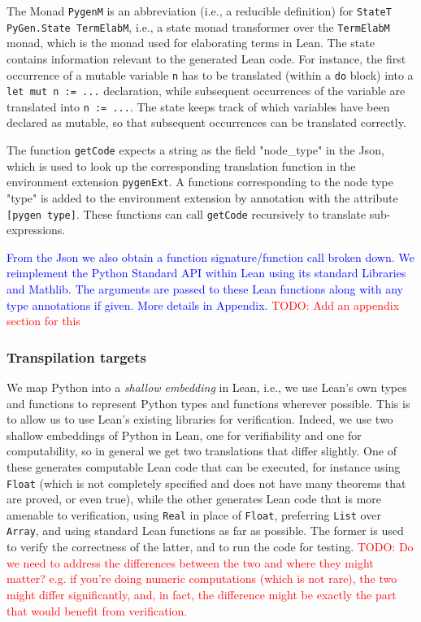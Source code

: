 \documentclass{article}
\newcommand{\code}{\lstinline}
\newcommand{\todo}[1]{\textcolor{red}{TODO: #1}}
\newcommand{\suggest}[1]{\textcolor{blue}{#1}}
\begin{document}
The Monad \code{PygenM} is an abbreviation (i.e., a reducible definition) for \code{StateT PyGen.State TermElabM}, i.e., a state monad transformer over the \code{TermElabM} monad, which is the monad used for elaborating terms in Lean. The state contains information relevant to the generated Lean code. For instance, the first occurrence of a mutable variable \code{n} has to be translated (within a \code{do} block) into a \code{let mut n := ...} declaration, while subsequent occurrences of the variable are translated into \code{n := ...}. The state keeps track of which variables have been declared as mutable, so that subsequent occurrences can be translated correctly.

The function \code{getCode} expects a string as the field "node\_type" in the Json, which is used to look up the corresponding translation function in the environment extension \code{pygenExt}. A functions corresponding to the node type "type" is added to the environment extension by annotation with the attribute \code{[pygen type]}.
These functions can call \code{getCode} recursively to translate sub-expressions.

\suggest{From the Json we also obtain a function signature/function call broken down. We reimplement the Python Standard API within Lean using its standard Libraries and Mathlib. The arguments are passed to these Lean functions along with any type annotations if given. More details in Appendix.} \todo{Add an appendix section for this}

\subsubsection{Transpilation targets}

We map Python into a \emph{shallow embedding} in Lean, i.e., we use Lean's own types and functions to represent Python types and functions wherever possible. This is to allow us to use Lean's existing libraries for verification. Indeed, we use two shallow embeddings of Python in Lean, one for verifiability and one for computability, so in general we get two translations that differ slightly. One of these generates computable Lean code that can be executed, for instance using \code{Float} (which is not completely specified and does not have many theorems that are proved, or even true), while the other generates Lean code that is more amenable to verification, using \code{Real} in place of \code{Float}, preferring \code{List} over \code{Array}, and using standard Lean functions as far as possible. The former is used to verify the correctness of the latter, and to run the code for testing.
\todo{Do we need to address the differences between the two and where they might matter? e.g. if you're doing numeric computations (which is not rare), the two might differ significantly, and, in fact, the difference might be exactly the part that would benefit from verification.}
\end{document}
